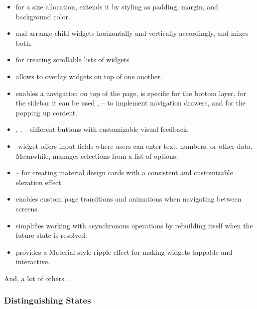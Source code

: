 \begin{itemize}
  \item {} for a size allocation,  extends it by styling as padding, margin, and background color.

  \item {} and  arrange child widgets horizontally and vertically accordingly, and   
  mixes both.

  \item {} for creating scrollable lists of widgets

  \item {} allows to overlay widgets on top of one another.

  \item {} enables a navigation on top of the page,  is specific for the bottom 
  layer, for the sidebar it can be used ,  -- to implement navigation drawers, and 
   for the popping up content.

  \item {}, ,  -- different buttons with customizable visual feedback.

  \item {}-widget offers input fields where users can enter text, numbers, or other data. Meanwhile,
   manages selections from a list of options.
  
  \item {} -- for creating material design cards with a consistent and customizable elevation effect.

  \item {} enables custom page transitions and animations when navigating between screens.

  \item {} simplifies working with asynchronous operations by rebuilding itself when the future state is 
  resolved.

  \item {} provides a Material-style ripple effect for making widgets tappable and interactive.
\end{itemize}

\noindent And, a lot of others...


\newpage
\subsubsection{Distinguishing States} \label{flutter-state}

